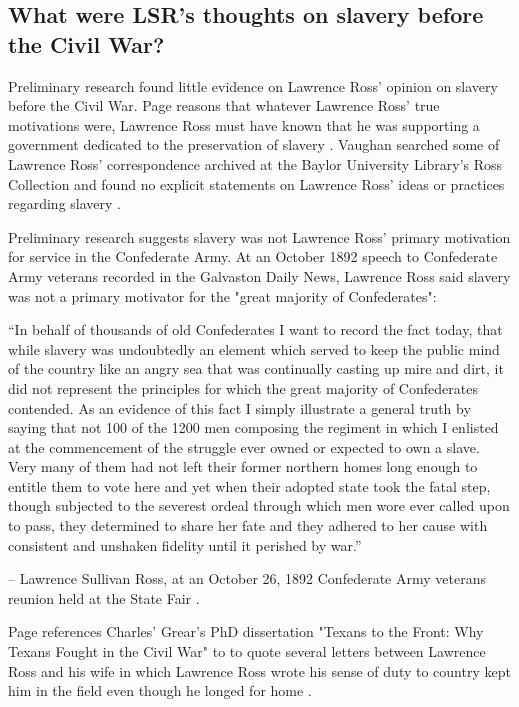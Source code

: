 \documentclass[12pt]{article}
\begin{document}
\subsection{What were LSR's thoughts on slavery before the Civil War? }
Preliminary research found little evidence on Lawrence Ross' opinion on slavery before the Civil War. Page reasons that whatever Lawrence Ross' true motivations were, Lawrence Ross must have known that he was supporting a government dedicated to the preservation of slavery \cite[pg. 59]{page}. Vaughan searched some of Lawrence Ross' correspondence archived at the Baylor University Library's Ross Collection and found no explicit statements on Lawrence Ross' ideas or practices regarding slavery \cite{vaughan:email}. 

Preliminary research suggests slavery was not Lawrence Ross' primary motivation for service in the Confederate Army. At an October 1892 speech to Confederate Army veterans recorded in the Galvaston Daily News, Lawrence Ross said slavery was not a primary motivator for the "great majority of Confederates":

\begin{displayquote}
“In behalf of thousands of old Confederates I want to record the fact today, that while slavery was undoubtedly an element which served to keep the public mind of the country like an angry sea that was continually casting up mire and dirt, it did not represent the principles for which the great majority of Confederates contended.  As an evidence of this fact I simply illustrate a general truth by saying that not 100 of the 1200 men composing the regiment in which I enlisted at the commencement of the struggle ever owned or expected to own a slave.  Very many of them had not left their former northern homes long enough to entitle them to vote here and yet when their adopted state took the fatal step, though subjected to the severest ordeal through which men wore ever called upon to pass, they determined to share her fate and they adhered to her cause with consistent and unshaken fidelity until it perished by war.” 

-- Lawrence Sullivan Ross, at an October 26, 1892 Confederate Army veterans reunion held at the State Fair \cite{gdaily:1892-10-26}.
\end{displayquote}

Page references Charles' Grear's PhD dissertation "Texans to the Front: Why Texans Fought in the Civil War" to to quote several letters between Lawrence Ross and his wife in which Lawrence Ross wrote his sense of duty to country kept him in the field even though he longed for home \cite[pg. 59--60]{page}.
\end{document}
